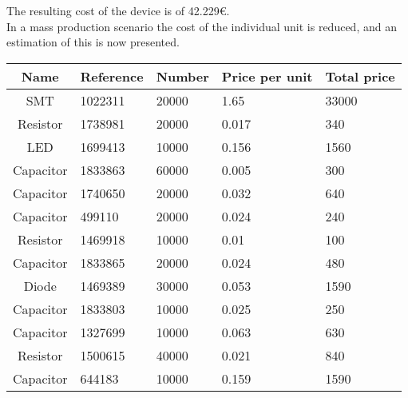 	The resulting cost of the device is of 42.229{\small \euro}.\\

	In a mass production scenario the cost of the individual unit is reduced, and an estimation of this is now presented.\\

\begin{tabular}{| c |l | l | l | l |} 
	\hline
		Name & Reference & Number & Price per unit & Total price\\ \hline
		SMT & 1022311 & 20000 & 1.65 & 33000\\ \hline
		Resistor & 1738981 & 20000 & 0.017 & 340\\ \hline
		LED & 1699413 & 10000 & 0.156 & 1560\\ \hline
		Capacitor & 1833863 & 60000 & 0.005 & 300\\ \hline
		Capacitor & 1740650 & 20000 & 0.032 & 640\\ \hline
		Capacitor & 499110 & 20000 & 0.024 & 240\\ \hline
		Resistor & 1469918 & 10000 & 0.01 & 100\\ \hline
		Capacitor & 1833865 & 20000 & 0.024  & 480\\ \hline
		Diode & 1469389 & 30000 & 0.053 & 1590\\ \hline
	   Capacitor & 1833803 & 10000 & 0.025 & 250\\ \hline
 		Capacitor & 1327699 & 10000 & 0.063 & 630 \\ \hline
  		Resistor & 1500615 & 40000 & 0.021 & 840\\ \hline
	 	Capacitor & 644183 & 10000 & 0.159 & 1590 \\ \hline
\end{tabular}\\\\
